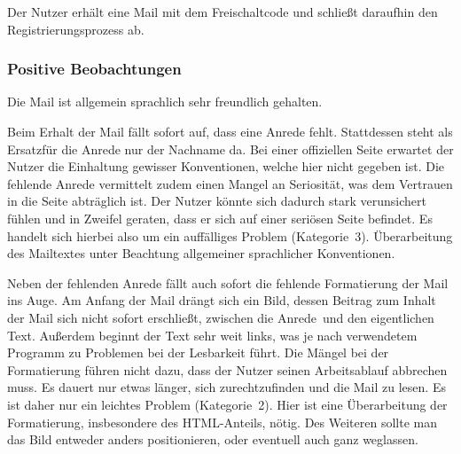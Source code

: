 \label{subsec:freischaltung}
Der Nutzer erhält eine Mail mit dem Freischaltcode und schließt daraufhin den Registrierungsprozess ab.


\subsubsection*{Positive Beobachtungen}
\label{subsubsec:freischaltung_mail_positiv}
Die Mail ist allgemein sprachlich sehr freundlich gehalten.

{
Beim Erhalt der Mail fällt sofort auf, dass eine Anrede fehlt. Stattdessen steht als \glqq Ersatz\grqq für die Anrede nur der Nachname da.
}
{
Bei einer offiziellen Seite erwartet der Nutzer die Einhaltung gewisser Konventionen, welche hier nicht gegeben ist. Die fehlende Anrede vermittelt zudem einen Mangel an Seriosität, was dem Vertrauen in die Seite abträglich ist. Der Nutzer könnte sich dadurch stark verunsichert fühlen und in Zweifel geraten, dass er sich auf einer seriösen Seite befindet. Es handelt sich hierbei also um ein auffälliges Problem (Kategorie~3).
}
{
Überarbeitung des Mailtextes unter Beachtung allgemeiner sprachlicher Konventionen.
}
\label{prob:frei:mailanrede}

{
Neben der fehlenden Anrede fällt auch sofort die fehlende Formatierung der Mail ins Auge. Am Anfang der Mail drängt sich ein Bild, dessen Beitrag zum Inhalt der Mail sich nicht sofort erschließt, zwischen die \glqq Anrede\grqq ~und den eigentlichen Text. Außerdem beginnt der Text sehr weit links, was je nach verwendetem Programm zu Problemen bei der Lesbarkeit führt.
}
{
Die Mängel bei der Formatierung führen nicht dazu, dass der Nutzer seinen Arbeitsablauf abbrechen muss. Es dauert nur etwas länger, sich zurechtzufinden und die Mail zu lesen. Es ist daher nur ein leichtes Problem (Kategorie~2).
}
{
Hier ist eine Überarbeitung der Formatierung, insbesondere des HTML-Anteils, nötig. Des Weiteren sollte man das Bild entweder anders positionieren, oder eventuell auch ganz weglassen.
}
\label{prob:frei:mailformat}

